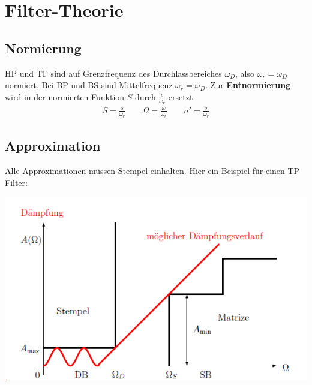 \section{Filter-Theorie}
\subsection{Normierung}
HP und TF sind auf Grenzfrequenz des Durchlassbereiches $\omega_D$, also $\omega_r = \omega_D$ normiert. Bei BP und BS sind Mittelfrequenz $\omega_r = \omega_D$. Zur \textbf{Entnormierung} wird in der normierten Funktion $S$ durch $\frac{s}{\omega_r}$ ersetzt.
\begin{align*}
	S = \frac{s}{\omega_r} \qquad \Omega = \frac{\omega}{\omega_r} \qquad \sigma' = \frac{\sigma}{\omega_r}
\end{align*}

\subsection{Approximation}
Alle Approximationen müssen Stempel einhalten. Hier ein Beispiel für einen TP-Filter: 
\begin{center}
	\includegraphics[width=0.5\columnwidth]{Images/tp_matrize}
\end{center}

